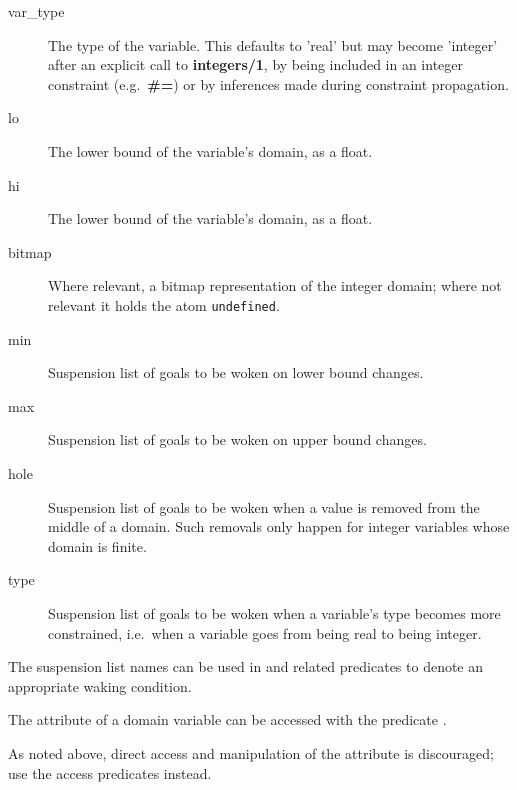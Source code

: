 \begin{description}
\item[var_type] The type of the variable.  This defaults to 'real' but may
become 'integer' after an explicit call to {\bf integers/1}, by being
included in an integer constraint (e.g.\ {\bf \#=}) or by inferences made
during constraint propagation.
\item[lo] The lower bound of the variable's domain, as a float.
\item[hi] The lower bound of the variable's domain, as a float.
\item[bitmap] Where relevant, a bitmap representation of the integer domain;
where not relevant it holds the atom \verb|undefined|.
\item[min] Suspension list of goals to be woken on lower bound changes.
\item[max] Suspension list of goals to be woken on upper bound changes.
\item[hole] Suspension list of goals to be woken when a value is removed
from the middle of a domain.  Such removals only happen for integer
variables whose domain is finite.
\item[type] Suspension list of goals to be woken when a variable's type
becomes more constrained, i.e.\ when a variable goes from being real to
being integer.
\end{description}

The suspension list names can be used in
 and
related predicates to denote an appropriate waking condition.

The attribute of a domain variable can be accessed with the predicate
.

As noted above, direct access and manipulation of the attribute is
discouraged; use the access predicates instead.



